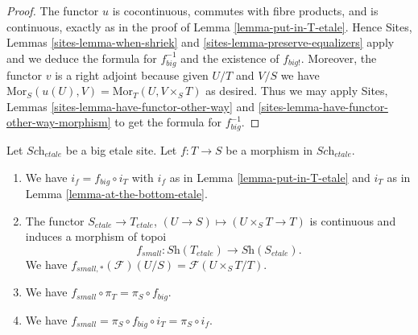 \begin{proof}
The functor $u$ is cocontinuous, commutes with fibre products,
and is continuous, exactly as in the proof of Lemma \ref{lemma-put-in-T-etale}.
Hence Sites, Lemmas \ref{sites-lemma-when-shriek}
and \ref{sites-lemma-preserve-equalizers}
apply and we deduce the formula
for $f_{big}^{-1}$ and the existence of $f_{big!}$. Moreover,
the functor $v$ is a right adjoint because given $U/T$ and $V/S$
we have $\text{Mor}_S(u(U), V) = \text{Mor}_T(U, V\times_S T)$
as desired. Thus we may apply
Sites, Lemmas \ref{sites-lemma-have-functor-other-way} and
\ref{sites-lemma-have-functor-other-way-morphism} to get the
formula for $f_{big}^{-1}$.
\end{proof}

\begin{lemma}
\label{lemma-morphism-big-small-etale}
Let $\textit{Sch}_{etale}$ be a big etale site.
Let $f : T \to S$ be a morphism in $\textit{Sch}_{etale}$.
\begin{enumerate}
\item We have $i_f = f_{big} \circ i_T$ with $i_f$ as in
Lemma \ref{lemma-put-in-T-etale} and $i_T$ as in
Lemma \ref{lemma-at-the-bottom-etale}.
\item The functor $S_{etale} \to T_{etale}$,
$(U \to S) \mapsto (U \times_S T \to T)$ is continuous and induces
a morphism of topoi
$$
f_{small} :
\textit{Sh}(T_{etale})
\longrightarrow
\textit{Sh}(S_{etale}).
$$
We have $f_{small, *}(\mathcal{F})(U/S) = \mathcal{F}(U\times_S T/T)$.
\item We have $f_{small} \circ \pi_T = \pi_S \circ f_{big}$.
\item We have $f_{small} = \pi_S \circ f_{big} \circ i_T = \pi_S \circ i_f$.
\end{enumerate}
\end{lemma}

